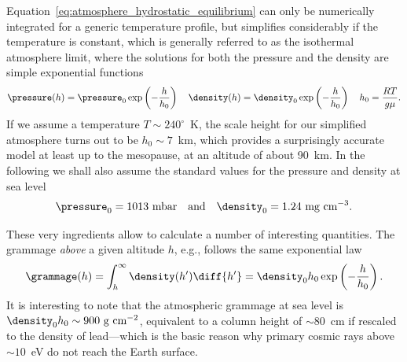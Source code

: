 \begin{marginfigure}
  
  \caption{Barometric density profile for an isothermal atmosphere at $T = 240^\circ$~K.}
  \label{fig:atmospheric_density}
\end{marginfigure}

Equation~\eqref{eq:atmosphere_hydrostatic_equilibrium} can only be numerically integrated
for a generic temperature profile, but simplifies considerably if the temperature
is constant, which is generally referred to as the isothermal atmosphere limit,
where the solutions for both the pressure and the density are simple exponential
functions
\begin{align}
  \pressure(h) = \pressure_0 \exp\left(-\frac{h}{h_0}\right)\quad
  \density(h) = \density_0 \exp\left(-\frac{h}{h_0}\right)\quad
  h_0 = \frac{RT}{g\mu}.
\end{align}
If we assume a temperature $T \sim 240^\circ$~K, the scale height for our simplified
atmosphere turns out to be $h_0 \sim 7$~km, which provides a surprisingly accurate
model at least up to the mesopause, at an altitude of about 90~km. In the following
we shall also assume the standard values for the pressure and density at sea level
\begin{align}
  \pressure_0 = 1013~\text{mbar}
  \quad\text{and}\quad
  \density_0 = 1.24~\text{mg~cm}^{-3}.
\end{align}

\begin{marginfigure}
  
  \caption{Grammage profile for an isothermal atmosphere at $T = 240^\circ$~K.}
  \label{fig:atmospheric_grammage}
\end{marginfigure}

These very ingredients allow to calculate a number of interesting quantities.
The grammage \emph{above} a given altitude $h$, e.g., follows the same exponential
law
\begin{align}\label{eq:atmospheric_grammage}
  \grammage(h) = \int_h^\infty \density(h') \diff{h'} =
  \density_0 h_0 \exp\left(-\frac{h}{h_0}\right).
\end{align}
It is interesting to note that the atmospheric grammage at sea level is
$\density_0 h_0 \sim 900~\text{g~cm}^{-2}$, equivalent to a column height of
$\sim 80$~cm if rescaled to the density of lead---which is the basic reason why
primary cosmic rays above $\sim 10$~eV do not reach the Earth surface.



